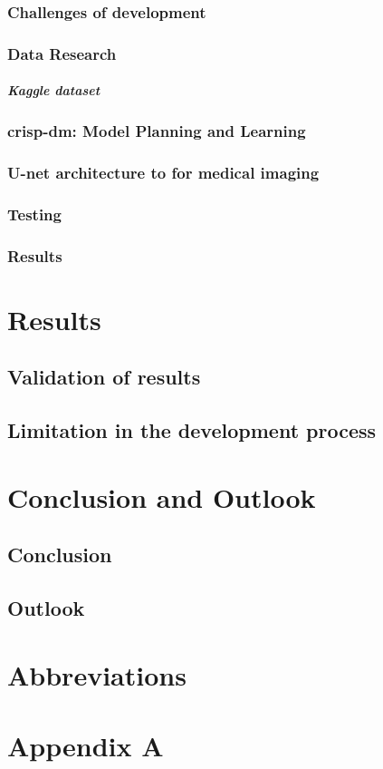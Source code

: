 \subsection{Challenges of development}


\subsection{Data Research}
\paragraph{Kaggle dataset}


\subsection{\ac{crisp-dm}: Model Planning and Learning}

\subsection{U-net architecture to for medical imaging}



\subsection{Testing}
\subsection{Results} 

\chapter{Results}
\section{Validation of results}
\section{Limitation in the development process}

\chapter{Conclusion and Outlook}
\section{Conclusion}
\section{Outlook}


\chapter{Abbreviations}


\printbibliography[heading=bibintoc]

\chapter{Appendix A}\label{appendix a}

%


